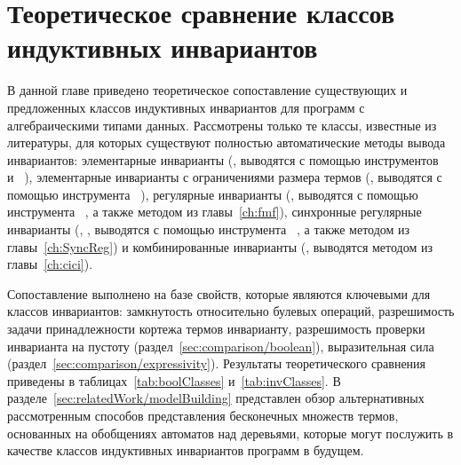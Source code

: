 \chapter{Теоретическое сравнение классов индуктивных инвариантов}\label{ch:comparison}

В данной главе приведено теоретическое сопоставление существующих и предложенных классов индуктивных инвариантов для программ с алгебраическими типами данных.
Рассмотрены только те классы, известные из  литературы, для которых существуют полностью автоматические методы вывода инвариантов: элементарные инварианты (\elemclass{}, выводятся с помощью инструментов \spacer{}~\cite{komuravelli2016smt} и \hoice{}~\cite{10.1007/978-3-030-02768-1_8}), элементарные инварианты с ограничениями размера термов (\sizeelemclass{}, выводятся с помощью инструмента \eldarica{}~\cite{8603013}), регулярные инварианты (\regclass{}, выводятся с помощью инструмента \rchc{}~\cite{haude2020}, а также методом из главы~\cref{ch:fmf}), синхронные регулярные инварианты (\syncRegFlatClass{}, \syncRegFullClass{}, выводятся с помощью инструмента \rchc{}~\cite{haude2020}, а также методом из главы~\cref{ch:SyncReg}) и комбинированные инварианты (\regelemclass{}, выводятся методом из главы~\cref{ch:cici}).

Сопоставление выполнено на базе свойств, которые являются ключевыми для классов инвариантов: замкнутость относительно булевых операций,  разрешимость задачи принадлежности кортежа термов инварианту, разрешимость  проверки инварианта на пустоту (раздел~\cref{sec:comparison/boolean}), выразительная сила (раздел~\cref{sec:comparison/expressivity}).
Результаты теоретического сравнения приведены в таблицах~\cref{tab:boolClasses} и~\cref{tab:invClasses}.
В разделе~\ref{sec:relatedWork/modelBuilding} представлен обзор альтернативных рассмотренным способов представления бесконечных множеств термов, основанных на обобщениях автоматов над деревьями, которые могут послужить в качестве классов индуктивных инвариантов программ в будущем.


